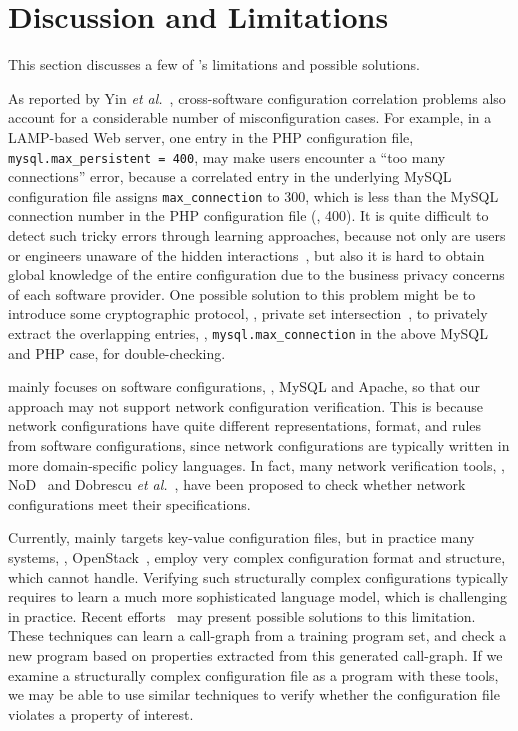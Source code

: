 
\section{Discussion and Limitations}

This section discusses a few of \app's limitations
and possible solutions.

As reported by Yin {\em et al.}~\cite{yin11anempirical},
cross-software configuration correlation problems also account
for a considerable number of misconfiguration cases.
For example, in a LAMP-based Web server, one entry in the
PHP configuration file, {\tt mysql.max\_persistent = 400},
may make users encounter a ``too many connections'' error,
because a correlated entry in the underlying MySQL configuration
file assigns {\tt max\_connection} to 300, which is less
than the MySQL connection number in the PHP configuration file (\ie, 400).
It is quite difficult to detect such tricky errors
through learning approaches, because not only are users or engineers 
unaware of the hidden interactions~\cite{xu15systems},
but also it is hard to obtain global knowledge of the entire
configuration due to the business privacy concerns of
each software provider.
One possible solution to this problem might be to introduce
some cryptographic protocol, \eg, private set
intersection~\cite{kissner05privacy}, to privately extract the
overlapping entries, \eg, {\tt mysql.max\_connection} in the 
above MySQL and PHP case, for double-checking.

\app mainly focuses on software configurations, \eg, MySQL and Apache,
so that our approach may not support network configuration
verification. This is because network configurations have quite
different representations, format, and rules from software configurations,
since network configurations are typically written in 
more domain-specific policy languages.
In fact, many network verification tools, 
\eg, NoD~\cite{lopes15checking} and 
Dobrescu {\em et al.}~\cite{dobrescu14software},
have been proposed to check whether network configurations
meet their specifications.

Currently, \app mainly targets key-value configuration files,
but in practice many systems, \eg, OpenStack~\cite{OpenStack},
employ very complex configuration format and structure,
which \app cannot handle.
Verifying such structurally complex configurations typically requires 
\app to learn a much more sophisticated language model,
which is challenging in practice.
Recent efforts~\cite{raychev15predicting, raychev16learning} 
may present possible solutions to this limitation.
These techniques can learn a call-graph from a training program set,
and check a new program based on properties extracted from this
generated call-graph. If we examine a structurally complex configuration 
file as a program with these tools, we may be able to use similar techniques 
to verify whether the configuration file violates a property of interest. 
